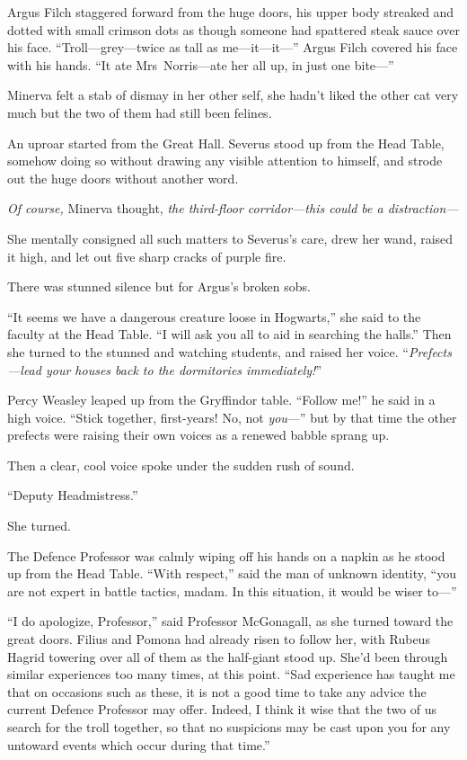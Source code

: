 Argus Filch staggered forward from the huge doors, his upper body streaked and
dotted with small crimson dots as though someone had spattered steak sauce over
his face. “Troll—grey—twice as tall as me—it—it—” Argus Filch covered
his face with his hands. “It ate Mrs~Norris—ate her all up, in just one
bite—”

Minerva felt a stab of dismay in her other self, she hadn’t liked the other cat
very much but the two of them had still been felines.

An uproar started from the Great Hall. Severus stood up from the Head Table,
somehow doing so without drawing any visible attention to himself, and strode
out the huge doors without another word.

\emph{Of course,} Minerva thought, \emph{the third-floor corridor—this could
be a distraction—}

She mentally consigned all such matters to Severus’s care, drew her wand,
raised it high, and let out five sharp cracks of purple fire.

There was stunned silence but for Argus’s broken sobs.

“It seems we have a dangerous creature loose in Hogwarts,” she said to the
faculty at the Head Table. “I will ask you all to aid in searching the halls.”
Then she turned to the stunned and watching students, and raised her voice.
“\emph{Prefects—lead your houses back to the dormitories immediately!}”

Percy Weasley leaped up from the Gryffindor table. “Follow me!” he said in a
high voice. “Stick together, first-years! No, not \emph{you}—” but by that
time the other prefects were raising their own voices as a renewed babble
sprang up.

Then a clear, cool voice spoke under the sudden rush of sound.

“Deputy Headmistress.”

She turned.

The Defence Professor was calmly wiping off his hands on a napkin as he stood
up from the Head Table. “With respect,” said the man of unknown identity, “you
are not expert in battle tactics, madam. In this situation, it would be wiser
to—”

“I do apologize, Professor,” said Professor McGonagall, as she turned toward
the great doors. Filius and Pomona had already risen to follow her, with Rubeus
Hagrid towering over all of them as the half-giant stood up. She’d been through
similar experiences too many times, at this point. “Sad experience has taught
me that on occasions such as these, it is not a good time to take any advice
the current Defence Professor may offer. Indeed, I think it wise that the two
of us search for the troll together, so that no suspicions may be cast upon you
for any untoward events which occur during that time.”


